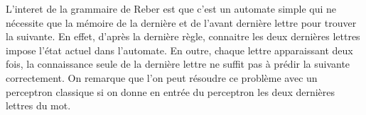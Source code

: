 \vspace{\parskip}
L'interet de la grammaire de Reber est que c'est un automate simple qui ne nécessite que la mémoire de la dernière et de l'avant dernière lettre pour trouver la suivante. En effet, d'après la dernière règle, connaitre les deux dernières lettres impose l'état actuel dans l'automate. En outre, chaque lettre apparaissant deux fois, la connaissance seule de la dernière lettre ne suffit pas à prédir la suivante correctement. On remarque que l'on peut résoudre ce problème avec un perceptron classique si on donne en entrée du perceptron les deux dernières lettres du mot.